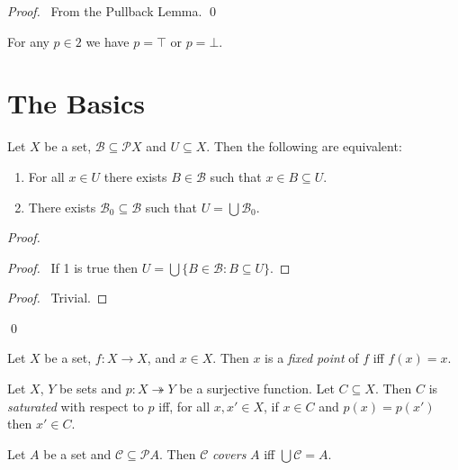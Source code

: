 \begin{proof}
  \pf\ From the Pullback Lemma. \qed
\end{proof}

\begin{ax}[Boolean]
  For any $p \in 2$ we have $p = \top$ or $p = \bot$.
\end{ax}

\section{The Basics}

\begin{lm}
  \label{lm:set_theory:union_of_subsets}
  Let $X$ be a set, $\mathcal{B} \subseteq \mathcal{P} X$ and $U \subseteq
  X$. Then the following are equivalent:
  \begin{enumerate}
    \item For all $x \in U$ there exists $B \in \mathcal{B}$ such that $x \in
    B \subseteq U$.
    \item There exists $\mathcal{B}_0 \subseteq \mathcal{B}$ such that $U =
    \bigcup \mathcal{B}_0$.
  \end{enumerate}
\end{lm}

\begin{proof}
  \pf
  \begin{proof}
    \pf\ If 1 is true then $U = \bigcup \{ B \in \mathcal{B} : B \subseteq U
    \}$.
  \end{proof}
  \begin{proof}
    \pf\ Trivial.
  \end{proof}
  \qed
\end{proof}

\begin{df}
  Let $X$ be a set, $f : X \rightarrow X$, and $x \in X$. Then $x$ is a
  \emph{fixed point} of $f$ iff $f(x) = x$.
\end{df}

\begin{df}[Saturated]
  Let $X$, $Y$ be sets and $p : X \twoheadrightarrow Y$ be a surjective
  function. Let $C \subseteq X$. Then $C$ is \emph{saturated} with respect to
  $p$ iff, for all $x, x' \in X$, if $x \in C$ and $p(x) = p(x')$ then $x'
  \in
  C$.
\end{df}

\begin{df}[Cover]
  Let $A$ be a set and $\mathcal{C} \subseteq \mathcal{P}
  A$. Then $\mathcal{C}$ \emph{covers} $A$ iff $\bigcup \mathcal{C} = A$.
\end{df}

